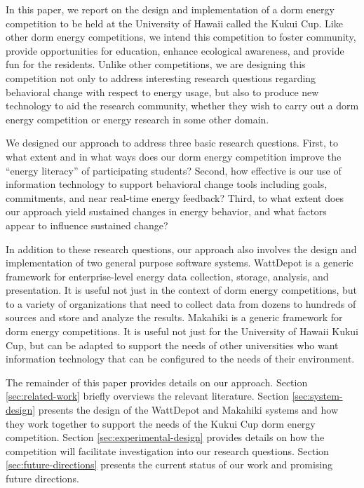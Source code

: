 In this paper, we report on the design and implementation of a dorm energy
competition to be held at the University of Hawaii called the Kukui Cup.
Like other dorm energy competitions, we intend this competition to foster
community, provide opportunities for education, enhance ecological
awareness, and provide fun for the residents.  Unlike other competitions,
we are designing this competition not only to address interesting research
questions regarding behavioral change with respect to energy usage, but
also to produce new technology to aid the research community, whether they
wish to carry out a dorm energy competition or energy research in some
other domain. 

We designed our approach to address three basic research questions.  First,
to what extent and in what ways does our dorm energy competition improve
the ``energy literacy'' of participating students?  Second, how effective
is our use of information technology to support behavioral change tools
including goals, commitments, and near real-time energy feedback? Third, to
what extent does our approach yield sustained changes in energy behavior,
and what factors appear to influence sustained change?

In addition to these research questions, our approach also involves the
design and implementation of two general purpose software systems.
WattDepot is a generic framework for enterprise-level energy data
collection, storage, analysis, and presentation.  It is useful not just in
the context of dorm energy competitions, but to a variety of organizations
that need to collect data from dozens to hundreds of sources and store and
analyze the results.  Makahiki is a generic framework for dorm energy
competitions.  It is useful not just for the University of Hawaii Kukui
Cup, but can be adapted to support the needs of other universities who want
information technology that can be configured to the needs of their
environment.

The remainder of this paper provides details on our approach.  Section
\ref{sec:related-work} briefly overviews the relevant literature.  Section
\ref{sec:system-design} presents the design of the WattDepot and Makahiki
systems and how they work together to support the needs of the Kukui Cup
dorm energy competition.  Section \ref{sec:experimental-design} provides details
on how the competition will facilitate investigation into our research questions. 
Section \ref{sec:future-directions} presents the current status of our work and promising future
directions. 

